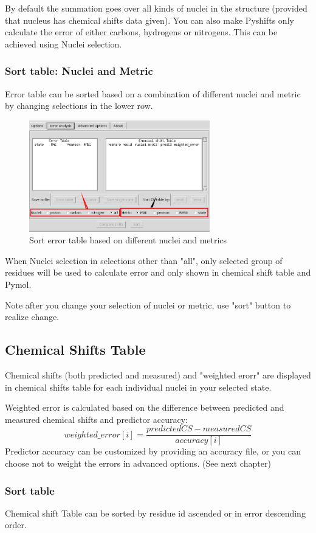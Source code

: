 \documentclass{article}
\begin{document}
By default the summation goes over all kinds of nuclei in the structure (provided that nucleus has chemical shifts data given). You can also make Pyshifts only calculate the error of either carbons, hydrogens or nitrogens. This can be achieved using Nuclei selection.

\subsubsection{Sort table: Nuclei and Metric}
Error table can be sorted based on a combination of different nuclei and metric by changing selections in the lower row.
\begin{figure}[htbp]
\centering
\includegraphics[width=0.7\textwidth]{sort_error_table_copy}
\caption{Sort error table based on different nuclei and metrics}
\label{fig:error_analysis_1}
\end{figure}
When Nuclei selection in selections other than "all", only selected group of residues will be used to calculate error and only shown in chemical shift table and Pymol.

Note after you change your selection of nuclei or metric, use "sort" button to realize change.

\subsection{Chemical Shifts Table}
Chemical shifts (both predicted and measured) and "weighted erorr" are displayed in chemical shifts table for each individual nuclei in your selected state. 

Weighted error is calculated based on the difference between predicted and measured chemical shifts and predictor accuracy:
$$weighted\_error[i] = \frac{predictedCS-measuredCS}{accuracy[i]}$$
Predictor accuracy can be customized by providing an accuracy file, or you can choose not to weight the errors in advanced options. (See next chapter)
\subsubsection{Sort table}
Chemical shift Table can be sorted by residue id ascended or in error descending order.
\end{document}
